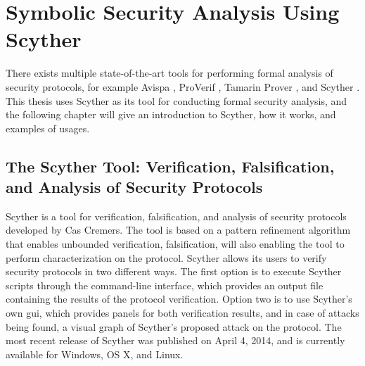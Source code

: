 \chapter{Symbolic Security Analysis Using Scyther}
\label{chp:scyther} 


There exists multiple state-of-the-art tools for performing formal analysis of security protocols, for example Avispa \cite{avispa}, ProVerif \cite{proverif}, Tamarin Prover \cite{meier2013tamarin}, and Scyther \cite{scyther}. This thesis uses Scyther as its tool for conducting formal security analysis, and the following chapter will give an introduction to Scyther, how it works, and examples of usages.


\section{The Scyther Tool: Verification, Falsification, and Analysis of Security Protocols}

Scyther is a tool for verification, falsification, and analysis of security protocols developed by Cas Cremers. The tool is based on a pattern refinement algorithm that enables unbounded verification, falsification, will also enabling the tool to perform characterization \cite{cremers2008scyther} on the protocol. Scyther allows its users to verify security protocols in two different ways. The first option is to execute Scyther scripts through the command-line interface, which provides an output file containing the results of the protocol verification. Option two is to use Scyther's own \gls{gui}, which provides panels for both verification results, and in case of attacks being found, a visual graph of Scyther's proposed attack on the protocol. The most recent release of Scyther was published on April 4, 2014, and is currently available for Windows, OS X, and Linux.


